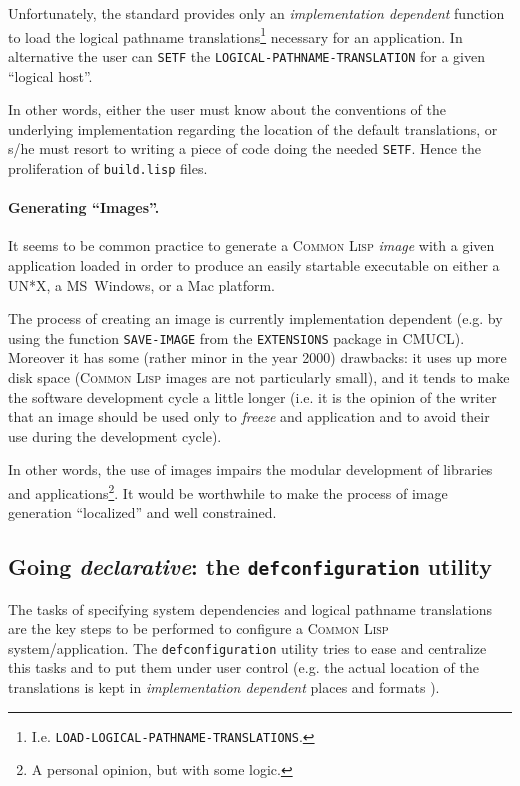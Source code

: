\documentclass[a4paper]{article}
\newcommand{\CL}{\textsc{Common Lisp}}
\newcommand{\defconfiguration}{\texttt{defconfiguration}}
\newcommand{\code}[1]{\texttt{#1}}
\newcommand{\clobject}[1]{\texttt{\textit{#1}}} %
\begin{document}
Unfortunately, the standard provides only an \emph{implementation
dependent} function to load the logical pathname
translations\footnote{I.e. \code{LOAD-LOGICAL-PATHNAME-TRANSLATIONS}.}
necessary for an application. In alternative the user can \code{SETF}
the \code{LOGICAL-PATHNAME-TRANSLATION} for a given ``logical host''.

In other words, either the user must know about the conventions of the
underlying implementation regarding the location of the default
translations, or s/he must resort to writing a piece of code doing the
needed \code{SETF}.  Hence the proliferation of \texttt{build.lisp}
files.


\paragraph{Generating ``Images''.} It seems to be common practice to
generate a \CL{} \emph{image} with a given application loaded in order
to produce an easily startable executable on either a UN*X, a
MS~Windows, or a Mac platform.

The process of creating an image is currently implementation dependent
(e.g. by using the function \code{SAVE-IMAGE} from the
\code{EXTENSIONS} package in CMUCL).  Moreover it has some (rather
minor in the year 2000) drawbacks: it uses up more disk
space (\CL{} images are not particularly small), and it tends to make
the software development cycle a little longer (i.e. it is the opinion
of the writer that an image should be used only to \emph{freeze} and
application and to avoid their use during the development cycle).

In other words, the use of images impairs the modular development of
libraries and applications\footnote{A personal
opinion, but with some logic.}. It would be worthwhile to make the
process of image generation ``localized'' and well constrained.


\subsection{Going \emph{declarative}: the \defconfiguration{} utility}

The tasks of specifying system dependencies and logical pathname
translations are the key steps to be performed to configure a \CL{}
system/application.  The \defconfiguration{} utility tries to ease and
centralize this tasks and to put them under user control (e.g. the
actual location of the \clobject{} translations is kept in
\emph{implementation dependent} places and formats
\cite{pitman96:_common_lisp_hyper}).
\end{document}
